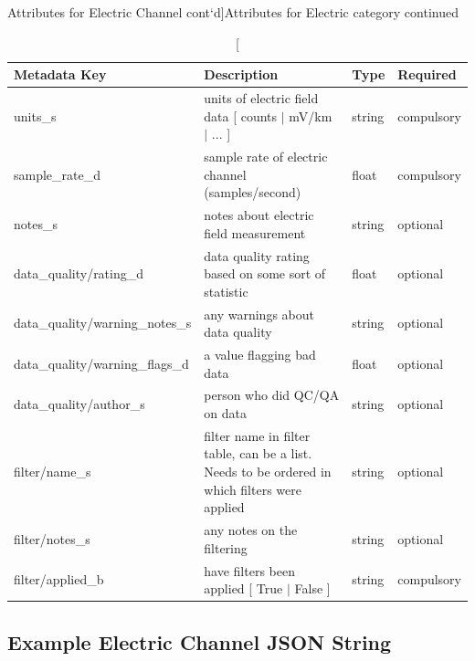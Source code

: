 \documentclass{article}
\begin{document}
\newpage
\begin{table}[htb!]
	\caption[Attributes for Electric Channel cont`d]{Attributes for Electric category continued}
	\begin{tabular}{|l|p{3in}|l|l|}
		\hline
		\textbf{Metadata Key} & \textbf{Description} & \textbf{Type} & \textbf{Required} \\ \hline
		units\_s & units of electric field data [ counts $|$ mV/km $|$ ... ] & string & compulsory \\ \hline
		sample\_rate\_d & sample rate of electric channel (samples/second) & float & compulsory \\ \hline
		notes\_s & notes about electric field measurement & string &  optional \\ \hline
		data\_quality/rating\_d & data quality rating based on some sort of statistic & float & optional \\ \hline
		data\_quality/warning\_notes\_s & any warnings about data quality & string & optional \\ \hline
		data\_quality/warning\_flags\_d & a value flagging bad data  & float &  optional \\ \hline
		data\_quality/author\_s & person who did QC/QA on data & string &  optional \\ \hline
		filter/name\_s & filter name in filter table, can be a list. Needs to be ordered in which filters were applied & string &  optional \\ \hline
		filter/notes\_s & any notes on the filtering & string &  optional \\ \hline
		filter/applied\_b & have filters been applied [ True $|$ False ] & string & compulsory \\ \hline
		\end{tabular}
		\label{tab:electric02}
\end{table}	

\newpage
\subsection{Example Electric Channel JSON String}
\end{document}
